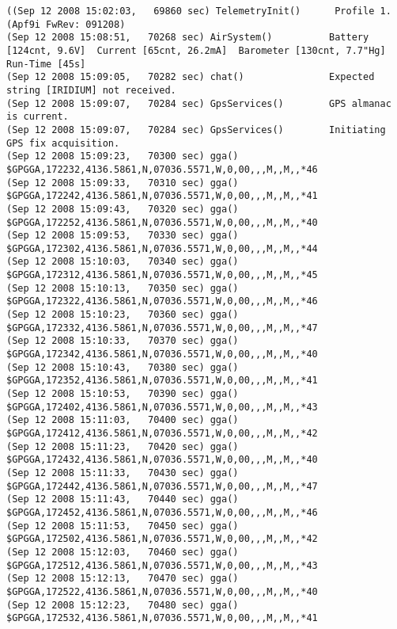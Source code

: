 {\tiny
\begin{verbatim}
((Sep 12 2008 15:02:03,   69860 sec) TelemetryInit()      Profile 1. (Apf9i FwRev: 091208)
(Sep 12 2008 15:08:51,   70268 sec) AirSystem()          Battery [124cnt, 9.6V]  Current [65cnt, 26.2mA]  Barometer [130cnt, 7.7"Hg]  Run-Time [45s]
(Sep 12 2008 15:09:05,   70282 sec) chat()               Expected string [IRIDIUM] not received.
(Sep 12 2008 15:09:07,   70284 sec) GpsServices()        GPS almanac is current.
(Sep 12 2008 15:09:07,   70284 sec) GpsServices()        Initiating GPS fix acquisition.
(Sep 12 2008 15:09:23,   70300 sec) gga()                $GPGGA,172232,4136.5861,N,07036.5571,W,0,00,,,M,,M,,*46
(Sep 12 2008 15:09:33,   70310 sec) gga()                $GPGGA,172242,4136.5861,N,07036.5571,W,0,00,,,M,,M,,*41
(Sep 12 2008 15:09:43,   70320 sec) gga()                $GPGGA,172252,4136.5861,N,07036.5571,W,0,00,,,M,,M,,*40
(Sep 12 2008 15:09:53,   70330 sec) gga()                $GPGGA,172302,4136.5861,N,07036.5571,W,0,00,,,M,,M,,*44
(Sep 12 2008 15:10:03,   70340 sec) gga()                $GPGGA,172312,4136.5861,N,07036.5571,W,0,00,,,M,,M,,*45
(Sep 12 2008 15:10:13,   70350 sec) gga()                $GPGGA,172322,4136.5861,N,07036.5571,W,0,00,,,M,,M,,*46
(Sep 12 2008 15:10:23,   70360 sec) gga()                $GPGGA,172332,4136.5861,N,07036.5571,W,0,00,,,M,,M,,*47
(Sep 12 2008 15:10:33,   70370 sec) gga()                $GPGGA,172342,4136.5861,N,07036.5571,W,0,00,,,M,,M,,*40
(Sep 12 2008 15:10:43,   70380 sec) gga()                $GPGGA,172352,4136.5861,N,07036.5571,W,0,00,,,M,,M,,*41
(Sep 12 2008 15:10:53,   70390 sec) gga()                $GPGGA,172402,4136.5861,N,07036.5571,W,0,00,,,M,,M,,*43
(Sep 12 2008 15:11:03,   70400 sec) gga()                $GPGGA,172412,4136.5861,N,07036.5571,W,0,00,,,M,,M,,*42
(Sep 12 2008 15:11:23,   70420 sec) gga()                $GPGGA,172432,4136.5861,N,07036.5571,W,0,00,,,M,,M,,*40
(Sep 12 2008 15:11:33,   70430 sec) gga()                $GPGGA,172442,4136.5861,N,07036.5571,W,0,00,,,M,,M,,*47
(Sep 12 2008 15:11:43,   70440 sec) gga()                $GPGGA,172452,4136.5861,N,07036.5571,W,0,00,,,M,,M,,*46
(Sep 12 2008 15:11:53,   70450 sec) gga()                $GPGGA,172502,4136.5861,N,07036.5571,W,0,00,,,M,,M,,*42
(Sep 12 2008 15:12:03,   70460 sec) gga()                $GPGGA,172512,4136.5861,N,07036.5571,W,0,00,,,M,,M,,*43
(Sep 12 2008 15:12:13,   70470 sec) gga()                $GPGGA,172522,4136.5861,N,07036.5571,W,0,00,,,M,,M,,*40
(Sep 12 2008 15:12:23,   70480 sec) gga()                $GPGGA,172532,4136.5861,N,07036.5571,W,0,00,,,M,,M,,*41

\end{verbatim}}
